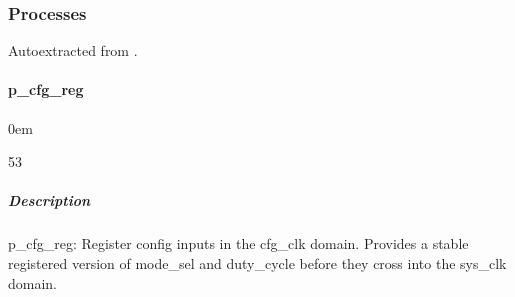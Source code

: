\documentclass[letterpaper,10pt,english]{sphinxmanual}
\begin{document}
\sphinxstepscope


\subsubsection{Processes}
\label{\detokenize{modules/cfg_sync/processes/index:processes}}\label{\detokenize{modules/cfg_sync/processes/index::doc}}
\sphinxAtStartPar
Auto\sphinxhyphen{}extracted from .

\sphinxstepscope


\paragraph{p\_cfg\_reg}
\label{\detokenize{modules/cfg_sync/processes/p_cfg_reg:p-cfg-reg}}\label{\detokenize{modules/cfg_sync/processes/p_cfg_reg::doc}}
\begin{DUlineblock}{0em}
\item[]  
\item[]  53
\item[]  
\item[]  
\end{DUlineblock}


\subparagraph{Description}
\label{\detokenize{modules/cfg_sync/processes/p_cfg_reg:description}}
\sphinxAtStartPar
p\_cfg\_reg: Register config inputs in the cfg\_clk domain.
Provides a stable registered version of mode\_sel and duty\_cycle
before they cross into the sys\_clk domain.
\end{document}
